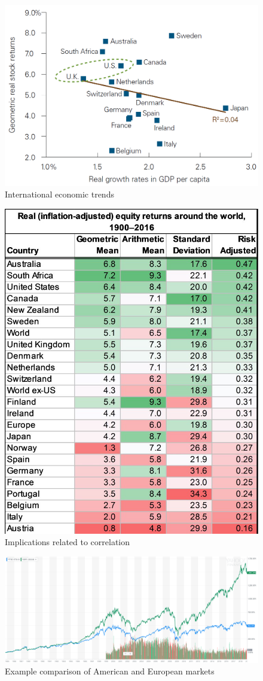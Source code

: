 \documentclass{article}
\begin{document}
\begin{figure}[!htb]
    \centering
    \includegraphics[width=\textwidth]{imgs/105.png}
    \caption{International economic trends}
\end{figure}

\vspace{10pt}

\begin{figure}[!htb]
    \centering
    \includegraphics[width=.56\textwidth]{imgs/106.png}
    \caption{Implications related to correlation}
\end{figure}

\vspace{10pt}

\begin{figure}[!htb]
    \centering
    \includegraphics[width=\textwidth]{imgs/107.png}
    \caption{Example comparison of American and European markets}
\end{figure}
\end{document}
